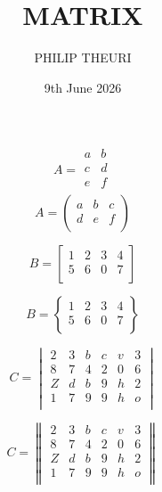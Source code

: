 \documentclass[a4paper, 12pt]{article}
\title{MATRIX}
\author{PHILIP THEURI}
\date{9th June 2026}
\begin{document}
	\maketitle
	\section*{\huge\centering{}}
	\begin{equation*}
A=
\begin{matrix}
	a & b\\
	c & d\\
	e & f\\
	\end{matrix}
	\end{equation*}
\begin{equation*}
	A=	
	\begin{pmatrix}
a & b & c\\
d  & e & f \\
\end{pmatrix}	
\end{equation*}	
	
	\begin{equation*}
		B=
	\begin{bmatrix}
		1 & 2 & 3 & 4 \\
		5 & 6 & 0 & 7\\
	\end{bmatrix}
	\end{equation*}
	
	
		\begin{equation*}
		B=
		\begin{Bmatrix}
			1 & 2 & 3 & 4 \\
			5 & 6 & 0 & 7\\
		\end{Bmatrix}
	\end{equation*}
	
	
	\begin{equation*}
		C=
	\begin{vmatrix}
		2 & 3 & b & c & v & 3\\
		8 & 7 & 4 & 2 & 0 & 6\\
		Z & d & b & 9 & h & 2\\
		1 & 7 & 9 & 9 & h & o\\
		\end{vmatrix}
	\end{equation*}
	
	
		\begin{equation*}
		C=
		\begin{Vmatrix}
			2 & 3 & b & c & v & 3\\
			8 & 7 & 4 & 2 & 0 & 6\\
			Z & d & b & 9 & h & 2\\
			1 & 7 & 9 & 9 & h & o\\
		\end{Vmatrix}
	\end{equation*}
	
\end{document}

